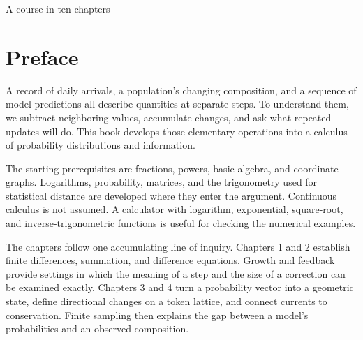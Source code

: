 \documentclass[11pt,oneside,openany]{book}
\theoremstyle{definition}
\theoremstyle{remark}
\numberwithin{equation}{chapter}
\begin{document}
\frontmatter
\begin{titlepage}\color{ink}\centering\vspace*{1.0in}{\small\sffamily PROBABILITY AND MATHEMATICAL MODELLING\par}\vspace{.45in}{\Huge\bfseries Discrete Information\\[.12in]Geometry\par}\vspace{.35in}{\Large Finite Differences, Probability,\\and Information Flows\par}\vfill{}\vfill{\large A course in ten chapters\par}\end{titlepage}
\chapter*{Preface}
A record of daily arrivals, a population's changing composition, and a sequence of model predictions all describe quantities at separate steps. To understand them, we subtract neighboring values, accumulate changes, and ask what repeated updates will do. This book develops those elementary operations into a calculus of probability distributions and information.

The starting prerequisites are fractions, powers, basic algebra, and coordinate graphs. Logarithms, probability, matrices, and the trigonometry used for statistical distance are developed where they enter the argument. Continuous calculus is not assumed. A calculator with logarithm, exponential, square-root, and inverse-trigonometric functions is useful for checking the numerical examples.

The chapters follow one accumulating line of inquiry. Chapters 1 and 2 establish finite differences, summation, and difference equations. Growth and feedback provide settings in which the meaning of a step and the size of a correction can be examined exactly. Chapters 3 and 4 turn a probability vector into a geometric state, define directional changes on a token lattice, and connect currents to conservation. Finite sampling then explains the gap between a model's probabilities and an observed composition.
\end{document}
